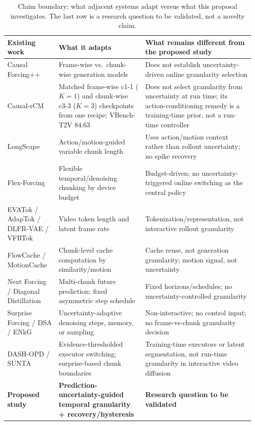 \documentclass[11pt,a4paper]{article}
\begin{document}
\begin{table}[t]
\centering
\small
\renewcommand{\arraystretch}{1.3}
\begin{tabularx}{\textwidth}{>{\raggedright\arraybackslash}p{3.1cm} >{\raggedright\arraybackslash}X >{\raggedright\arraybackslash}X}
\toprule
\textbf{Existing work} & \textbf{What it adapts} & \textbf{What remains different from the proposed study} \\
\midrule
Causal Forcing++ & Frame-wise vs.\ chunk-wise generation models & Does not establish uncertainty-driven online granularity selection \\
Causal-rCM & Matched frame-wise c1-1 ($K{=}1$) and chunk-wise c3-3 ($K{=}3$) checkpoints from one recipe; VBench-T2V 84.63 & Does not select granularity from uncertainty at run time; its action-conditioning remedy is a training-time prior, not a run-time controller \\
LongScape & Action/motion-guided variable chunk length & Uses action/motion context rather than rollout uncertainty; no spike recovery \\
Flex-Forcing & Flexible temporal/denoising chunking by device budget & Budget-driven; no uncertainty-triggered online switching as the central policy \\
EVATok / AdapTok / DLFR-VAE / VFRTok & Video token length and latent frame rate & Tokenization/representation, not interactive rollout granularity \\
FlowCache / MotionCache & Chunk-level cache computation by similarity/motion & Cache reuse, not generation granularity; motion signal, not uncertainty \\
Next Forcing / Diagonal Distillation & Multi-chunk future prediction; fixed asymmetric step schedule & Fixed horizons/schedules; no uncertainty-controlled granularity \\
Surprise Forcing / DSA / ENkG & Uncertainty-adaptive denoising steps, memory, or sampling & Non-interactive; no control input; no frame-vs-chunk granularity decision \\
DASH-OPD / SUNTA & Evidence-thresholded executor switching; surprise-based chunk boundaries & Training-time executors or latent segmentation, not run-time granularity in interactive video diffusion \\
\addlinespace
\textbf{Proposed study} & \textbf{Prediction-uncertainty-guided temporal granularity + recovery/hysteresis} & \textbf{Research question to be validated} \\
\bottomrule
\end{tabularx}
\caption{Claim boundary: what adjacent systems adapt versus what this proposal investigates. The last row is a research question to be validated, not a novelty claim.}
\label{tab:claimboundary}
\end{table}
\end{document}
